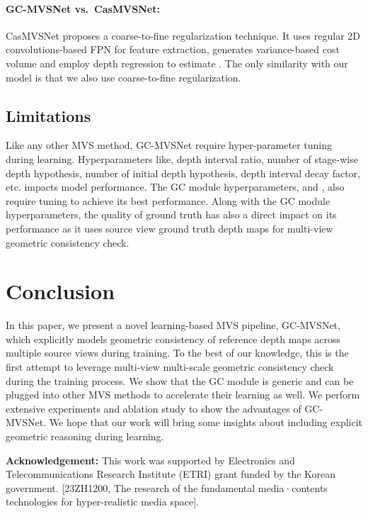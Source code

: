 \documentclass[10pt,twocolumn,letterpaper]{article}
\begin{document}
\vspace{-10pt}
\paragraph{GC-MVSNet vs.~CasMVSNet:}
CasMVSNet \cite{gu2019casmvsnet} proposes a coarse-to-fine regularization
technique. It uses regular 2D convolutions-based FPN for feature
extraction, generates variance-based cost volume and employ depth
regression to estimate . The only similarity with our model is
that we also use coarse-to-fine regularization.

\vspace{-5pt}
\subsection{Limitations}
Like any other MVS method, GC-MVSNet require hyper-parameter tuning during learning. Hyperparameters like, depth interval ratio, number of stage-wise depth hypothesis, number of initial depth hypothesis, depth interval decay factor, etc. impacts model performance. The GC module hyperparameters,  and , also require tuning to achieve its best performance. Along with the GC module hyperparameters, the quality of ground truth has also a direct impact on its performance as it uses source view ground truth depth maps for multi-view geometric consistency check.




\vspace{-8pt}
\section{Conclusion}

In this paper, we present a novel learning-based MVS pipeline,
GC-MVSNet, which explicitly models geometric consistency of reference
depth maps across multiple source views during training. To the best
of our knowledge, this is the first attempt to leverage multi-view
multi-scale geometric consistency check during the training
process. We show that the GC module is generic and can be plugged into
other MVS methods to accelerate their learning as well.  We perform
extensive experiments and ablation study to show the advantages of
GC-MVSNet.  
We hope that our work will bring some insights about including explicit geometric reasoning during learning.

\textbf{Acknowledgement:}
This work was supported by Electronics and Telecommunications Research Institute (ETRI) 
grant funded by the Korean government. 
[23ZH1200, The research of the fundamental media·contents technologies for hyper-realistic media space].




















\newpage

{\small


}
\end{document}
